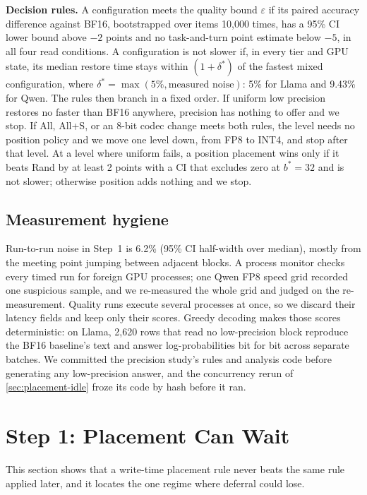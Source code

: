\documentclass[conference]{IEEEtran}
\newcommand{\cfg}[1]{\textsf{#1}}
\begin{document}
\textbf{Decision rules.}
A configuration meets the quality bound $\varepsilon$ if its paired accuracy difference against \cfg{BF16}, bootstrapped over items 10,000 times, has a 95\% CI lower bound above $-2$ points and no task-and-turn point estimate below $-5$, in all four read conditions.
A configuration is not slower if, in every tier and GPU state, its median restore time stays within $(1{+}\delta^\ast)$ of the fastest mixed configuration, where $\delta^\ast=\max(5\%,\text{measured noise})$: 5\% for Llama and 9.43\% for Qwen.
The rules then branch in a fixed order.
If uniform low precision restores no faster than BF16 anywhere, precision has nothing to offer and we stop.
If \cfg{All}, \cfg{All+S}, or an 8-bit codec change meets both rules, the level needs no position policy and we move one level down, from FP8 to INT4, and stop after that level.
At a level where uniform fails, a position placement wins only if it beats \cfg{Rand} by at least 2 points with a CI that excludes zero at $b^\ast=32$ and is not slower; otherwise position adds nothing and we stop.

\subsection{Measurement hygiene}\label{sec:method-hygiene}
Run-to-run noise in Step~1 is 6.2\% (95\% CI half-width over median), mostly from the meeting point jumping between adjacent blocks.
A process monitor checks every timed run for foreign GPU processes; one Qwen FP8 speed grid recorded one suspicious sample, and we re-measured the whole grid and judged on the re-measurement.
Quality runs execute several processes at once, so we discard their latency fields and keep only their scores.
Greedy decoding makes those scores deterministic: on Llama, 2,620 rows that read no low-precision block reproduce the BF16 baseline's text and answer log-probabilities bit for bit across separate batches.
We committed the precision study's rules and analysis code before generating any low-precision answer, and the concurrency rerun of \cref{sec:placement-idle} froze its code by hash before it ran.

\section{Step 1: Placement Can Wait}\label{sec:placement}
This section shows that a write-time placement rule never beats the same rule applied later, and it locates the one regime where deferral could lose.
\end{document}
